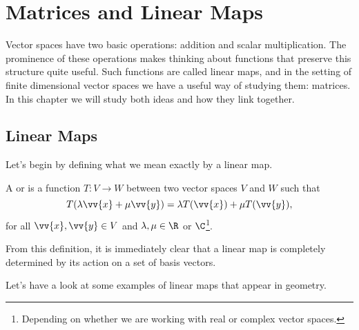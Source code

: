 \chapter{Matrices and Linear Maps}

Vector spaces have two basic operations: addition and scalar multiplication. 
The prominence of these operations makes thinking about functions that preserve this structure quite useful. Such functions are called linear maps, and in the setting of finite dimensional vector spaces we have a useful way of studying them: matrices. In this chapter we will study both ideas and how they link together.

\section{Linear Maps}

Let's begin by defining what we mean exactly by a linear map.

\begin{definition}
    A  or  is a function $T : V \rightarrow W$ between two vector spaces $V$ and $W$ such that
    $$
    T(\lambda \vv{x} + \mu \vv{y}) = \lambda T(\vv{x}) + \mu T(\vv{y}),
    $$
    for all $\vv{x}, \vv{y} \in V$ and $\lambda, \mu \in \R$ or $\C$\footnote{Depending on whether we are working with real or complex vector spaces.}.
\end{definition}

From this definition, it is immediately clear that a linear map is completely determined by its action on a set of basis vectors.

Let's have a look at some examples of linear maps that appear in geometry.

